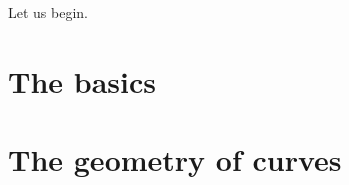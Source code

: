 \documentclass[a4paper]{memoir}
\theoremstyle{definition}
\begin{document}
Let us begin.

\cleardoublepage
\begin{KeepFromToc}
\tableofcontents*
\end{KeepFromToc}

\mainmatter


\chapter{The basics}










\chapter{The geometry of curves}


\end{document}
